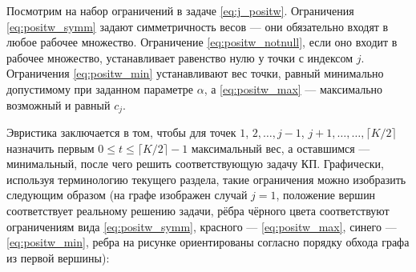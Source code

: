 \documentclass[10pt]{article}
\begin{document}
Посмотрим на набор ограничений в задаче \eqref{eq:j_positw}. Ограничения \eqref{eq:positw_symm} задают симметричность весов --- они обязательно входят в любое рабочее множество. Ограничение \eqref{eq:positw_notnull}, если оно входит в рабочее множество, устанавливает равенство нулю у точки с индексом $j$. Ограничения \eqref{eq:positw_min} устанавливают вес точки, равный минимально допустимому при заданном параметре $\alpha$, а \eqref{eq:positw_max} --- максимально возможный и равный $c_j$.

Эвристика заключается в том, чтобы для точек $1$, $2, \ldots, j-1$, $j + 1, \ldots, \ldots, \lceil K/2\rceil$ назначить первым $0 \le t \le \lceil K/2\rceil - 1$ максимальный вес, а оставшимся --- минимальный, после чего решить соответствующую задачу КП.  Графически, используя терминологию текущего раздела, такие ограничения можно изобразить следующим образом (на графе изображен случай $j = 1$, положение вершин соответствует реальному решению задачи, рёбра чёрного цвета соответствуют ограничениям вида \eqref{eq:positw_symm}, красного ---  \eqref{eq:positw_max}, синего --- \eqref{eq:positw_min}, ребра на рисунке ориентированы согласно порядку обхода графа из первой вершины):

\begin{center}
\end{center}
\end{document}
